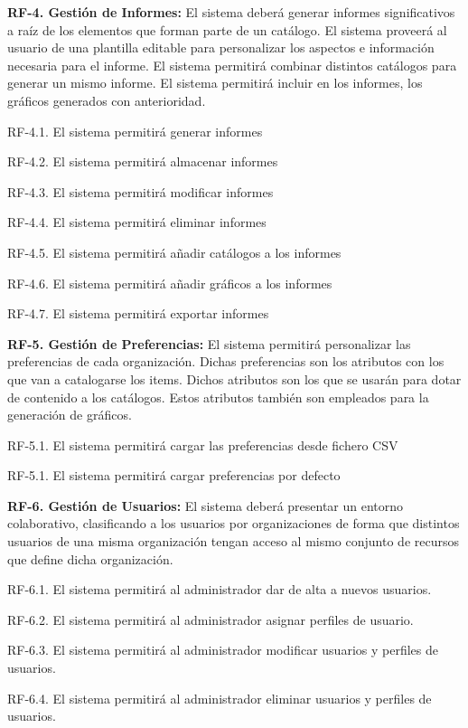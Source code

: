 \documentclass[a4paper,11pt]{book}
\begin{document}
	 
\textbf{RF-4. Gestión de Informes:} El sistema deberá generar informes significativos a raíz de los elementos que forman parte de un catálogo. El sistema proveerá al usuario de una plantilla editable para personalizar los aspectos e información necesaria para el informe. El sistema permitirá combinar distintos catálogos para generar un mismo informe.  El sistema permitirá incluir en los informes, los gráficos generados con anterioridad. 

	

	RF-4.1. El sistema permitirá generar informes
	
	RF-4.2. El sistema permitirá almacenar informes
	
	RF-4.3. El sistema permitirá modificar informes
	
	RF-4.4. El sistema permitirá eliminar informes
	
	RF-4.5. El sistema permitirá añadir catálogos a los informes
	
	RF-4.6. El sistema permitirá añadir gráficos a los informes
	
	RF-4.7. El sistema permitirá exportar informes
	

\textbf{RF-5. Gestión de Preferencias:} El sistema permitirá personalizar las preferencias de cada organización. Dichas preferencias son los atributos con los que van a catalogarse los items. Dichos atributos son los que se usarán para dotar de contenido a los catálogos. Estos atributos también son empleados para la generación de gráficos. 


	RF-5.1. El sistema permitirá cargar las preferencias desde fichero CSV
	
	RF-5.1. El sistema permitirá cargar preferencias por defecto 
	
	

\textbf{RF-6. Gestión de Usuarios:} El sistema deberá presentar un entorno colaborativo, clasificando a los usuarios por organizaciones de forma que distintos usuarios de una misma organización tengan acceso al mismo conjunto de recursos que define dicha organización. 


	RF-6.1. El sistema permitirá al administrador dar de alta a nuevos usuarios.
	
	RF-6.2. El sistema permitirá al administrador asignar perfiles de usuario.
	
	RF-6.3. El sistema permitirá al administrador modificar usuarios y perfiles de usuarios.
	
	RF-6.4. El sistema permitirá al administrador eliminar usuarios y perfiles de usuarios.
\end{document}
